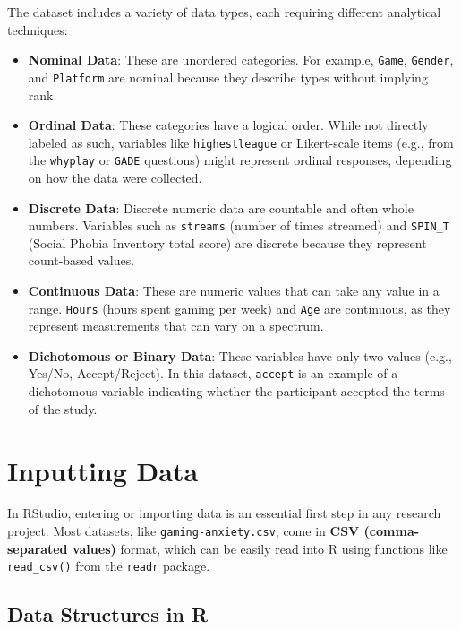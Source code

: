 \documentclass[
]{book}
\begin{document}
The dataset includes a variety of data types, each requiring different analytical techniques:

\begin{itemize}
\item
  \textbf{Nominal Data}: These are unordered categories. For example, \texttt{Game}, \texttt{Gender}, and \texttt{Platform} are nominal because they describe types without implying rank.
\item
  \textbf{Ordinal Data}: These categories have a logical order. While not directly labeled as such, variables like \texttt{highestleague} or Likert-scale items (e.g., from the \texttt{whyplay} or \texttt{GADE} questions) might represent ordinal responses, depending on how the data were collected.
\item
  \textbf{Discrete Data}: Discrete numeric data are countable and often whole numbers. Variables such as \texttt{streams} (number of times streamed) and \texttt{SPIN\_T} (Social Phobia Inventory total score) are discrete because they represent count-based values.
\item
  \textbf{Continuous Data}: These are numeric values that can take any value in a range. \texttt{Hours} (hours spent gaming per week) and \texttt{Age} are continuous, as they represent measurements that can vary on a spectrum.
\item
  \textbf{Dichotomous or Binary Data}: These variables have only two values (e.g., Yes/No, Accept/Reject). In this dataset, \texttt{accept} is an example of a dichotomous variable indicating whether the participant accepted the terms of the study.
\end{itemize}

\section{Inputting Data}\label{inputting-data}

In RStudio, entering or importing data is an essential first step in any research project. Most datasets, like \texttt{gaming-anxiety.csv}, come in \textbf{CSV (comma-separated values)} format, which can be easily read into R using functions like \texttt{read\_csv()} from the \texttt{readr} package.

\subsection*{Data Structures in R}\label{data-structures-in-r}
\end{document}
